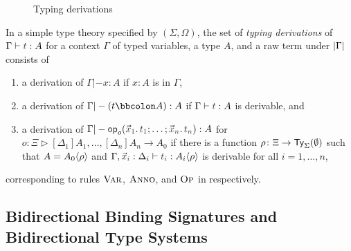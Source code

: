 \begin{definition}
  \begin{figure}
    \centering
    \small
    \caption{Typing derivations}
    \label{fig:extrinsic-typing}
  \end{figure}
  In a simple type theory specified by $(\Sigma, \Omega)$, the set of \emph{typing derivations} of $\Gamma \vdash \isTerm{t} : A$ for a context $\Gamma$ of typed variables, a type $A$, and a raw term under $\left|\Gamma\right|$ consists of 
  \begin{enumerate}
    \item a derivation of $\Gamma |- x : A$ if $x : A$ is in $\Gamma$,
    \item a derivation of $\Gamma |- (t \annotate A) : A$ if $\Gamma \vdash \isTerm{t} : A$ is derivable, and
    \item a derivation of $\Gamma |- \tmOpts : A$ for $o \colon \Xi \rhd [\Delta_1]A_1, \ldots, [\Delta_{n}]A_{n} \to A_0$ if there is a function $\rho\colon \Xi \to \mathsf{Ty}_{\Sigma}(\emptyset)$ such that $A = {A_0}\!\left<{\rho}\right>$ and $\Gamma, \vars{x}_{\isTerm{i}} : \Delta_i \vdash \isTerm{t_i} : \simsub{A_i}{\rho}$ is derivable for all $i = 1, \ldots, n$,
  \end{enumerate}
  corresponding to rules $\textnormal{\textsc{Var}}$, $\textnormal{\textsc{Anno}}$, and $\textnormal{\textsc{Op}}$ in  respectively.
\end{definition}


\subsection{Bidirectional Binding Signatures and Bidirectional Type Systems} \label{subsec:bidirectional-system}


